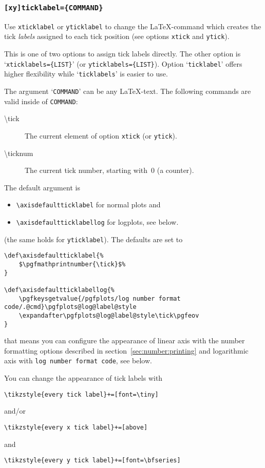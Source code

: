 \subsubsection{\texttt{[xy]ticklabel=\{COMMAND\}}}
Use \texttt{xticklabel} or \texttt{yticklabel} to change the \LaTeX-command which creates the tick \emph{labels} assigned to each tick position (see options \texttt{xtick} and \texttt{ytick}). 

This is one of two options to assign tick labels directly. The other option is `\texttt{xticklabels=\{LIST\}}' (or \texttt{yticklabels=\{LIST\}}). Option `\texttt{\*ticklabel}' offers higher flexibility while `\texttt{\*ticklabels}' is easier to use.

The argument `\texttt{COMMAND}' can be any \LaTeX-text. The following commands are valid inside of \texttt{COMMAND}:
\begin{description}
	\item[\textbackslash tick] The current element of option \lstinline!xtick! (or \lstinline!ytick!).
	\item[\textbackslash ticknum] The current tick number, starting with~0 (a counter).
\end{description}
The default argument is 
\begin{itemize}
	\item \lstinline!\axisdefaultticklabel! for normal plots and 
	\item \lstinline!\axisdefaultticklabellog! for logplots, see below.
\end{itemize}
(the same holds for \lstinline!yticklabel!). The defaults are set to
\begin{lstlisting}
\def\axisdefaultticklabel{%
	$\pgfmathprintnumber{\tick}$%
}

\def\axisdefaultticklabellog{%
	\pgfkeysgetvalue{/pgfplots/log number format code/.@cmd}\pgfplots@log@label@style
	\expandafter\pgfplots@log@label@style\tick\pgfeov
}
\end{lstlisting}
that means you can configure the appearance of linear axis with the number formatting options described in section~\ref{sec:number:printing} and logarithmic axis with \texttt{log number format code}, see below.

You can change the appearance of tick labels with
\begin{lstlisting}
\tikzstyle{every tick label}+=[font=\tiny]
\end{lstlisting}
and/or
\begin{lstlisting}
\tikzstyle{every x tick label}+=[above]
\end{lstlisting}
and
\begin{lstlisting}
\tikzstyle{every y tick label}+=[font=\bfseries]
\end{lstlisting}

